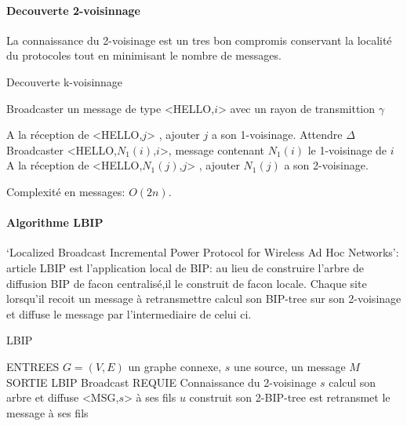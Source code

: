 \paragraph{Decouverte 2-voisinnage}

La connaissance du 2-voisinage est un tres bon compromis conservant la localité du protocoles tout en minimisant le nombre de messages.


\begin{algorithm}[h]
\caption{Decouverte k-voisinnage}
\label{algo_k_voisinnage}
\begin{algorithmic}

	\STATE Broadcaster un message de type <HELLO,$i$> avec un rayon de transmittion $\gamma$
\ENDFOR

\STATE A la réception de <HELLO,$j$> , ajouter $j$ a son 1-voisinage.
\STATE Attendre $\Delta$
	\STATE Broadcaster <HELLO,$N_1(i)$,$i$>, message contenant $N_1(i)$ le 1-voisinage de $i$
	\STATE A la réception de <HELLO,$N_1(j)$,$j$> , ajouter $N_1(j)$ a son 2-voisinage.
	
\ENDFOR
\end{algorithmic}
\end{algorithm}

Complexité en messages: $O(2n)$.


\paragraph{Algorithme LBIP}  `Localized Broadcast Incremental Power Protocol for Wireless Ad Hoc Networks': article \cite{Ingelrest2004}
LBIP est l'application local de BIP: au lieu de construire l'arbre de diffusion BIP de facon centralisé,il le construit de facon locale.
Chaque site lorsqu'il recoit un message à retransmettre calcul son BIP-tree sur son 2-voisinage et diffuse le message par l'intermediaire de celui ci.

\begin{algorithm}[h]
\caption{LBIP}
\label{algo_LBIP}
\begin{algorithmic}
\STATE ENTREES  $G=(V,E)$ un graphe connexe, $s$ une source, un message $M$
\STATE SORTIE  LBIP Broadcast
\STATE REQUIE  Connaissance du 2-voisinage
\STATE $s$ calcul son arbre et diffuse <MSG,$s$> à ses fils
		\STATE $u$ construit son 2-BIP-tree est retransmet le message à ses fils
	\ENDIF
\ENDIF
\end{algorithmic}
\end{algorithm}


